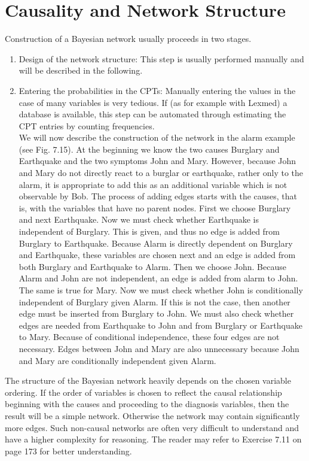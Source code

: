 \documentclass[10pt]{book}
\begin{document}
\section{Causality and Network Structure}
Construction of a Bayesian network usually proceeds in two stages.
\begin{enumerate}
  \item Design of the network structure: This step is usually performed manually and will be described in the following.
  \item Entering the probabilities in the CPTs: Manually entering the values in the case of many variables is very tedious. If (as for example with Lexmed) a database is available, this step can be automated through estimating the CPT entries by counting frequencies.\\
We will now describe the construction of the network in the alarm example (see Fig. 7.15). At the beginning we know the two causes Burglary and Earthquake and the two symptoms John and Mary. However, because John and Mary do not directly react to a burglar or earthquake, rather only to the alarm, it is appropriate to add this as an additional variable which is not observable by Bob. The process of adding edges starts with the causes, that is, with the variables that have no parent nodes. First we choose Burglary and next Earthquake. Now we must check whether Earthquake is independent of Burglary. This is given, and thus no edge is added from Burglary to Earthquake. Because Alarm is directly dependent on Burglary and Earthquake, these variables are chosen next and an edge is added from both Burglary and Earthquake to Alarm. Then we choose John. Because Alarm and John are not independent, an edge is added from alarm to John. The same is true for Mary. Now we must check whether John is conditionally independent of Burglary given Alarm. If this is not the case, then another edge must be inserted from Burglary to John. We must also check whether edges are needed from Earthquake to John and from Burglary or Earthquake to Mary. Because of conditional independence, these four edges are not necessary. Edges between John and Mary are also unnecessary because John and Mary are conditionally independent given Alarm.
\end{enumerate}

The structure of the Bayesian network heavily depends on the chosen variable ordering. If the order of variables is chosen to reflect the causal relationship beginning with the causes and proceeding to the diagnosis variables, then the result will be a simple network. Otherwise the network may contain significantly more edges. Such non-causal networks are often very difficult to understand and have a higher complexity for reasoning. The reader may refer to Exercise 7.11 on page 173 for better understanding.
\end{document}
